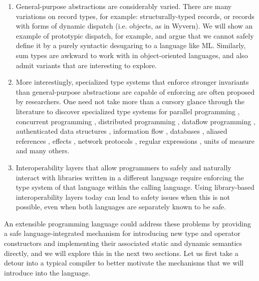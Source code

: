 \begin{enumerate}
\item General-purpose abstractions are considerably varied. There are many  variations on record types, for example: structurally-typed records, or records with forms of dynamic dispatch (i.e. objects, as in Wyvern). We will show an example of prototypic dispatch, for example, and argue that we cannot safely define it by a purely syntactic desugaring to a language like ML. Similarly, sum types are awkward to work with in object-oriented languages, and also admit variants that are interesting to explore.

\item More interestingly, specialized type systems that enforce stronger invariants than general-purpose abstractions are capable of enforcing are often proposed by researchers. One need not take more than a cursory glance through the literature to discover specialized type systems for parallel programming \cite{a,b}, concurrent programming \cite{cml,a,b}, distributed programming \cite{tom7}, dataflow programming \cite{reactiveml}, authenticated data structures \cite{popl13}, information flow \cite{walker00, smith2001}, databases \cite{db}, aliased references \cite{naden12}, effects \cite{effects},  network protocols \cite{sekar99}, regular expressions \cite{regex}, units of measure \cite{keneddy} and many others.
\item Interoperability layers that allow programmers to safely and naturally interact with libraries written in a different language require enforcing the type system of that language within the calling language. Using library-based interoperability layers today can lead to safety issues when this is not possible, even when both languages are separately known to be safe.
\end{enumerate}
An extensible programming language could address these problems by providing a safe language-integrated mechanism for introducing new type and operator constructors and implementing their associated static and dynamic semantics directly, and we will explore this in the next two sections. Let us first take a detour into a typical compiler to better motivate the mechanisms that we will introduce into the language.

